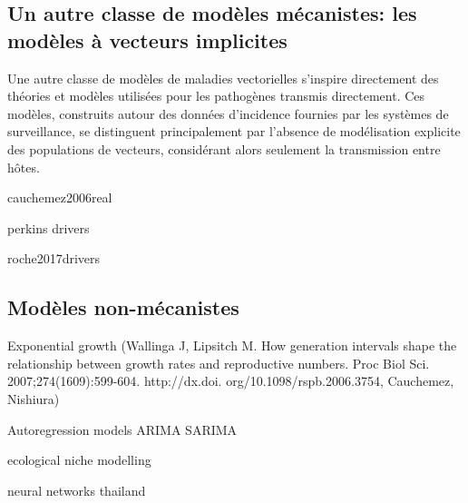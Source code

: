 \subsection{Un autre classe de modèles mécanistes: les modèles à vecteurs implicites}
\label{sec:sir}





Une autre classe de modèles de maladies vectorielles s'inspire directement des théories et modèles utilisées pour les pathogènes transmis directement.
Ces modèles, construits autour des données d'incidence fournies par les systèmes de surveillance, se distinguent principalement par l'absence de modélisation explicite des populations de vecteurs, considérant alors seulement la transmission entre hôtes.

cauchemez2006real

perkins drivers

roche2017drivers



\subsection{Modèles non-mécanistes}

Exponential growth (Wallinga J, Lipsitch M. How generation intervals shape the
relationship between growth rates and reproductive numbers.
Proc Biol Sci. 2007;274(1609):599-604. http://dx.doi.
org/10.1098/rspb.2006.3754, 
Cauchemez, Nishiura)

Autoregression models ARIMA SARIMA

ecological niche modelling

neural networks thailand





